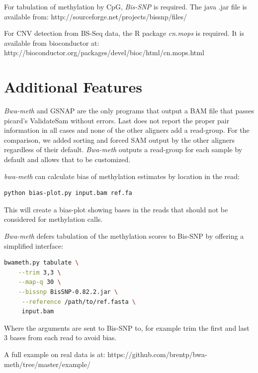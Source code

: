 \documentclass[12pt]{article}
\begin{document}
For tabulation of methylation by CpG, \emph{Bis-SNP} \cite{bissnp} is required.
The java .jar file is available from: http://sourceforge.net/projects/bissnp/files/

For CNV detection from BS-Seq data, the R package \emph{cn.mops} \cite{cnmops} is required.
It is available
from bioconductor \cite{bioconductor} at: http://bioconductor.org/packages/devel/bioc/html/cn.mops.html
\section{Additional Features}
\textit{Bwa-meth} and GSNAP are the only programs that output a BAM file that passes picard's ValidateSam without errors.
Last does not report the proper pair information in all cases and none of the other aligners add a read-group.
For the comparison, we added sorting and forced SAM output by the other aligners regardless of their default.
\textit{Bwa-meth} outputs a read-group for each sample by default and allows that to be customized.

\textit{bwa-meth} can calculate bias of methylation estimates by location in the read:

\begin{lstlisting}[language=bash]
python bias-plot.py input.bam ref.fa
\end{lstlisting}
This will create a bias-plot showing bases in the reads that should not be considered
for methylation calls.

\textit{Bwa-meth} defers tabulation of the methylation scores to Bis-SNP \cite{bissnp} by offering a simplified interface:
\begin{lstlisting}[language=bash]
bwameth.py tabulate \
    --trim 3,3 \
    --map-q 30 \
    --bissnp BisSNP-0.82.2.jar \
     --reference /path/to/ref.fasta \
     input.bam
\end{lstlisting}
Where the arguments are sent to Bis-SNP to, for example trim the first and last 3 bases
from each read to avoid bias.

A full example on real data is at:
https://github.com/brentp/bwa-meth/tree/master/example/


    
\end{document}
